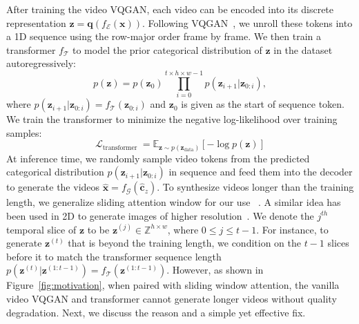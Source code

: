After training the video VQGAN, each video can be encoded into its discrete representation $\mathbf{z}=\mathbf{q}(f_\mathcal{E}(\mathbf{x}))$. 
Following VQGAN~\cite{esser2021taming}, we unroll these tokens into a 1D sequence using the row-major 
order frame by frame. 
We then train a transformer $f_\mathcal{T}$ to model the prior categorical distribution of $\mathbf{z}$ in the dataset autoregressively:
$$p(\mathbf{z}) = p(\mathbf{z}_{0})\prod_{i=0}^{t\times h\times w-1}p(\mathbf{z}_{i+1}|\mathbf{z}_{0:i}),$$ 
where $p(\mathbf{z}_{i+1}|\mathbf{z}_{0:i}) = f_\mathcal{T}(\mathbf{z}_{0:i})$ and $\mathbf{z}_0$ is given as the start of sequence token.
We train the transformer to minimize the negative log-likelihood over training samples:
$$
\mathcal{L}_{\text {transformer }}=\mathbb{E}_{\mathbf{z} \sim p(\mathbf{z}_{\text{data}})}[-\log p(\mathbf{z})]
$$
At inference time, we randomly sample video tokens from the predicted categorical distribution $p(\mathbf{z}_{i+1}|\mathbf{z}_{0:i})$ in sequence and feed them into the decoder to generate the videos $\hat{\mathbf{x}}=f_\mathcal{G}(\hat{\mathbf{c}}_z)$. 
To synthesize videos longer than the training length, we generalize sliding attention window for our use~\cite{brown2020language} . 
A similar idea has been used in 2D to generate images of higher resolution~\cite{esser2021taming}.
We denote the $j^{th}$ temporal slice of $\mathbf{z}$ to be $\mathbf{z}^{(j)} \in \mathbb{Z}^{h\times w}$, where $0\le j \le t-1$. 
For instance, to generate $\mathbf{z}^{(t)}$ that is beyond the training length, we condition on the $t-1$ slices before it to match the transformer sequence length $p(\mathbf{z}^{(t)}|\mathbf{z}^{(1:t-1)}) = f_\mathcal{T}(\mathbf{z}^{(1:t-1)})$. 
However, as shown in Figure~\ref{fig:motivation}, when paired with sliding window attention, the vanilla video VQGAN and transformer cannot generate longer videos without quality degradation. 
Next, we discuss the reason and a simple yet effective fix. 



